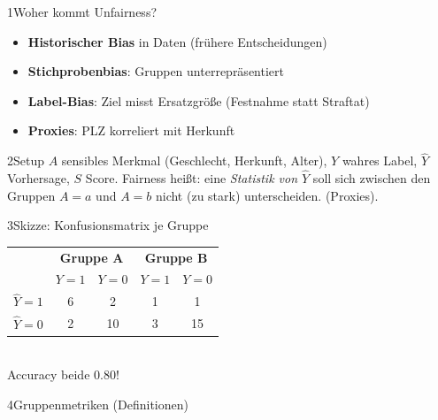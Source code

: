 
\begin{hngrid}
%
\begin{hnp}[raster multicolumn=2,acc=hnorange]{1}{Woher kommt Unfairness?}
\begin{itemize}
\item \textbf{Historischer Bias} in Daten (frühere Entscheidungen)
\item \textbf{Stichprobenbias}: Gruppen unterrepräsentiert
\item \textbf{Label-Bias}: Ziel misst Ersatzgröße (Festnahme statt Straftat)
\item \textbf{Proxies}: PLZ korreliert mit Herkunft
\end{itemize}
\end{hnp}
%
\begin{hnp}[raster multicolumn=2,acc=hnpurple]{2}{Setup}
$A$ sensibles Merkmal (Geschlecht, Herkunft, Alter), $Y$ wahres Label, $\hat Y$ Vorhersage, $S$ Score. Fairness heißt: eine \emph{Statistik von $\hat Y$} soll sich zwischen den Gruppen $A=a$ und $A=b$ nicht (zu stark) unterscheiden.  (Proxies).
\end{hnp}
%
\begin{hnp}[raster multicolumn=2,acc=hnteal]{3}{Skizze: Konfusionsmatrix je Gruppe}
\centering
\renewcommand{\arraystretch}{1.25}
\begin{tabular}{@{}c|cc|cc@{}}
&\multicolumn{2}{c|}{\textbf{Gruppe A}}&\multicolumn{2}{c}{\textbf{Gruppe B}}\\
&$Y{=}1$&$Y{=}0$&$Y{=}1$&$Y{=}0$\\\hline
$\hat Y{=}1$&\cellcolor{hnmint}6&\cellcolor{hnpink}2&\cellcolor{hnmint}1&\cellcolor{hnpink}1\\
$\hat Y{=}0$&\cellcolor{hnpink}2&\cellcolor{hnmint}10&\cellcolor{hnpink}3&\cellcolor{hnmint}15\\
\end{tabular}\\[1pt]
{\tiny Accuracy beide $0.80$!}
\end{hnp}
%
\begin{hnp}[raster multicolumn=3,acc=hnnavy]{4}{Gruppenmetriken (Definitionen)}

\end{hnp}
\end{hngrid}
